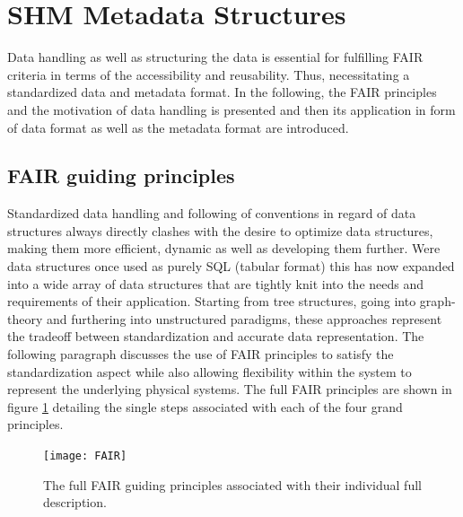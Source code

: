 \newpage


\section{SHM Metadata Structures}

Data handling as well as structuring the data is essential for fulfilling FAIR criteria in terms of the accessibility and reusability. Thus, necessitating a standardized data and metadata format. In the following, the FAIR principles and the motivation of data handling is presented and then its application in form of data format as well as the metadata format are introduced.


\subsection{FAIR guiding principles}

Standardized data handling and following of conventions in regard of data structures always directly clashes with the desire to optimize data structures, making them more efficient, dynamic as well as developing them further. Were data structures once used as purely SQL (tabular format) this has now expanded into a wide array of data structures that are tightly knit into the needs and requirements of their application. Starting from tree structures, going into graph-theory and furthering into unstructured paradigms, these approaches represent the tradeoff between standardization and accurate data representation. The following paragraph discusses the use of FAIR principles to satisfy the standardization aspect while also allowing flexibility within the system to represent the underlying physical systems. The full FAIR principles are shown in figure \ref{fig:FAIR} detailing the single steps associated with each of the four grand principles.\cite{wilkinson_fair_2016}
\begin{figure}[h]
    \centering
    \texttt{[image: FAIR]}
    \caption[The FAIR principles \cite{wilkinson_fair_2016}]{The full FAIR guiding principles associated with their individual full description. \cite{wilkinson_fair_2016}}
    \label{fig:FAIR}
\end{figure}

